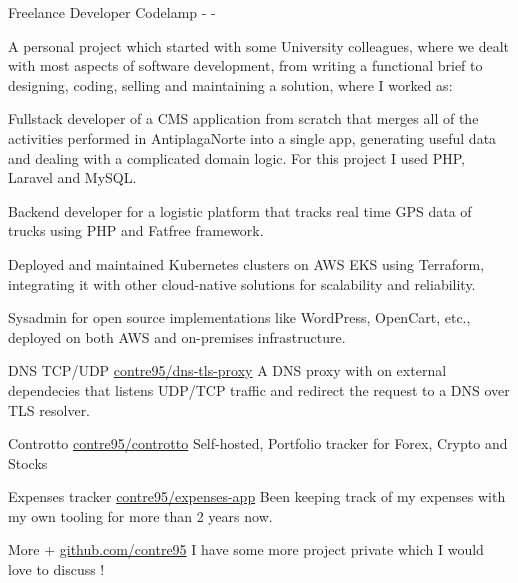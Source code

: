 \hypersetup{colorlinks}
\begin{cventries}

	\cventry
	{Freelance Developer} %
	{Codelamp} %
	{-} %
	{-} %
	{
		{A personal project which started with some University colleagues, where we dealt with most aspects of software development, from writing a functional brief to designing, coding, selling and maintaining a solution, where I worked as: }
		\linebreak
		\begin{cvitems}
          \item {Fullstack developer of a CMS application from scratch that merges all of the activities performed in AntiplagaNorte into a single app, generating useful data and dealing with a complicated domain logic. For this project I used PHP, Laravel and MySQL.}
          \item {Backend developer for a logistic platform that tracks real time GPS data of trucks using PHP and Fatfree framework.}
          \item {Deployed and maintained Kubernetes clusters on AWS EKS using Terraform, integrating it with other cloud-native solutions for scalability and reliability.}
          \item {Sysadmin for open source implementations like WordPress, OpenCart, etc., deployed on both AWS and on-premises infrastructure.}
		\end{cvitems}
	}


	\cventry
	{DNS TCP/UDP } %
    {}
	{} %
    {\href{https://github.com/contre95/dns-tls-proxy}{\url{contre95/dns-tls-proxy}}}
    {A DNS proxy with on external dependecies that listens UDP/TCP traffic and redirect the request to a DNS over TLS resolver.}

	\cventry
	{Controtto} %
	{} %
	{} %
	{\href{https://github.com/contre95/controtto}{\url{contre95/controtto}}} %
    {Self-hosted, Portfolio tracker for Forex, Crypto and Stocks}

	\cventry
	{Expenses tracker} %
	{} %
	{} %
	{\href{https://github.com/contre95/expenses-app}{\url{contre95/expenses-app}}} %
    {Been keeping track of my expenses with my own tooling for more than 2 years now.}

	\cventry
	{More +} %
	{} %
	{} %
	{\href{http://github.com/contre95}{\url{github.com/contre95}}} %
    {I have some more project private which I would love to discuss !}

\end{cventries}
